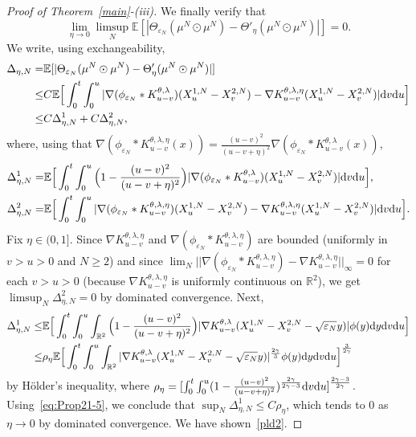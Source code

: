 \documentclass[11pt]{article}
\newcommand{\E}{\mathbb{E}}
\newcommand{\R}{\mathbb{R}}
\newcommand{\1}{\mathbbm{1}}
\newcommand{\dd}{{\rm d}}
\newcommand{\e}{\varepsilon}
\begin{document}
\begin{proof}[Proof of Theorem~\ref{main}-(iii)]
We finally verify that 
\begin{equation}\label{pld2}
\lim_{\eta\to 0} \limsup_{N} \E[|\Theta_{\e_N}(\mu^N\odot \mu^N)-\Theta'_\eta(\mu^N\odot \mu^N)|]=0.
\end{equation}
We write, using exchangeability,
\begin{align*}
\Delta_{\eta,N}=& \E[|\Theta_{\e_N}(\mu^N\odot \mu^N)-\Theta'_\eta(\mu^N\odot \mu^N)|]\\
\leq & C \E\Big[\int_0^t \int_0^u |\nabla(\phi_{\e_N}\ast K^{\theta,\lambda}_{u-v})(X^{1,N}_u-X^{2,N}_v) - \nabla K^{\theta,\lambda,\eta}_{u-v}(X^{1,N}_u-X^{2,N}_v)| \dd v\dd u  \Big]\\
\leq & C\Delta^1_{\eta,N}+C\Delta^2_{\eta,N},
\end{align*}
where, using that $\nabla(\phi_{\e_N}\ast K^{\theta,\lambda,\eta}_{u-v}(x))= \frac{(u-v)^2}{(u-v+\eta)^2}\nabla(\phi_{\e_N}\ast K^{\theta,\lambda}_{u-v}(x))$,
\begin{align*}
\Delta^1_{\eta,N}=&\E\Big[\int_0^t \int_0^u \Big(1-\frac{(u-v)^2}{(u-v+\eta)^2}\Big)|\nabla(\phi_{\e_N}\ast K^{\theta,\lambda}_{u-v})(X^{1,N}_u-X^{2,N}_v)|\dd v \dd u  \Big], \\
\Delta^2_{\eta,N}=&\E\Big[\int_0^t \int_0^u 
|\nabla(\phi_{\e_N}\ast K^{\theta,\lambda,\eta}_{u-v})(X^{1,N}_u-X^{2,N}_v) - \nabla K^{\theta,\lambda,\eta}_{u-v}(X^{1,N}_u-X^{2,N}_v)| \dd v \dd u\Big].
\end{align*}
Fix $\eta \in (0,1]$. Since $\nabla K^{\theta,\lambda,\eta}_{u-v}$ and $\nabla (\phi_{\e_N}\ast K^{\theta,\lambda,\eta}_{u-v})$ are bounded (uniformly in $v>u>0$ and $N\geq 2$)
and since $\lim_N||\nabla (\phi_{\e_N}\ast K^{\theta,\lambda,\eta}_{u-v})- \nabla K^{\theta,\lambda,\eta}_{u-v} ||_\infty =0$ for each $v>u>0$ (because $\nabla K^{\theta,\lambda,\eta}_{u-v}$
is uniformly continuous on $\R^2$), we get $\limsup_N \Delta^2_{\eta,N}=0$ by dominated convergence. Next,
\begin{align*}
\Delta^1_{\eta,N} \leq & \E\Big[\int_0^t \int_0^u \int_{\R^2}\Big(1-\frac{(u-v)^2}{(u-v+\eta)^2}\Big)|\nabla K^{\theta,\lambda}_{u-v}(X^{1,N}_u-X^{2,N}_v-\sqrt{\e_N}y)|\phi(y)\dd y\dd v \dd u  \Big]\\
\leq &  \rho_\eta \E\Big[\int_0^t \int_0^u \int_{\R^2} |\nabla K^{\theta,\lambda}_{u-v}(X^{1,N}_u-X^{2,N}_v-\sqrt{\e_N}y)|^{\frac{2\gamma}3}\phi(y)\dd y\dd v \dd u  \Big]^{\frac3{2\gamma}}
\end{align*}
by Hölder's inequality, where $\rho_\eta=[\int_0^t \int_0^u (1-\frac{(u-v)^2}{(u-v+\eta)^2})^{\frac{2\gamma}{2\gamma-3}}
\dd v \dd u]^{\frac{2\gamma-3}{2\gamma}}$.
Using~\eqref{eq:Prop21-5}, we conclude that $\sup_N \Delta^1_{\eta,N} \leq C \rho_\eta$, which tends to $0$ as $\eta\to 0$ by dominated convergence. We have shown~\eqref{pld2}.


\end{proof}
\end{document}
